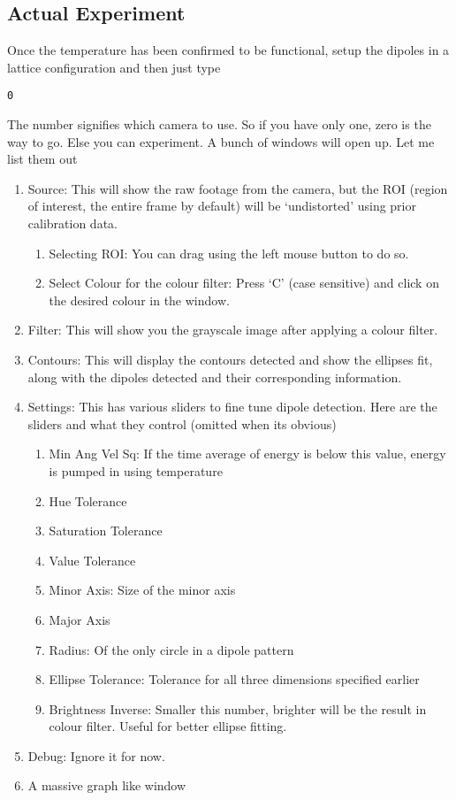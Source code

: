 	\subsection{Actual Experiment}
		Once the temperature has been confirmed to be functional, setup the dipoles in a lattice configuration and then just type
		\begin{lstlisting}
0
		\end{lstlisting}
		The number signifies which camera to use. So if you have only one, zero is the way to go. Else you can experiment. A bunch of windows will open up. Let me list them out
		\begin{enumerate}
			\item Source: This will show the raw footage from the camera, but the ROI (region of interest, the entire frame by default) will be `undistorted' using prior calibration data.
			\begin{enumerate}
				\item Selecting ROI: You can drag using the left mouse button to do so.
				\item Select Colour for the colour filter: Press `C' (case sensitive) and click on the desired colour in the window.
			\end{enumerate}
			\item Filter: This will show you the grayscale image after applying a colour filter.
			\item Contours: This will display the contours detected and show the ellipses fit, along with the dipoles detected and their corresponding information.
			\item Settings: This has various sliders to fine tune dipole detection. Here are the sliders and what they control (omitted when its obvious)
				\begin{enumerate}
					\item Min Ang Vel Sq: If the time average of energy is below this value, energy is pumped in using temperature
					\item Hue Tolerance
					\item Saturation Tolerance
					\item Value Tolerance
					\item Minor Axis: Size of the minor axis
					\item Major Axis
					\item Radius: Of the only circle in a dipole pattern
					\item Ellipse Tolerance: Tolerance for all three dimensions specified earlier
					\item Brightness Inverse: Smaller this number, brighter will be the result in colour filter. Useful for better ellipse fitting.
				\end{enumerate}
			\item Debug: Ignore it for now.
			\item A massive graph like window
		\end{enumerate}

